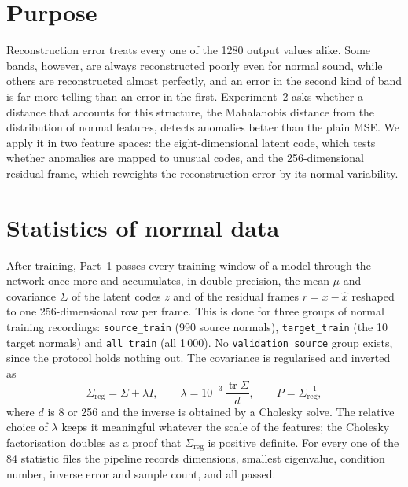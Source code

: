 \section{Purpose}
Reconstruction error treats every one of the 1280 output values alike. Some bands, however, are always reconstructed poorly even for normal sound, while others are reconstructed almost perfectly, and an error in the second kind of band is far more telling than an error in the first. Experiment~2 asks whether a distance that accounts for this structure, the Mahalanobis distance from the distribution of normal features, detects anomalies better than the plain MSE. We apply it in two feature spaces: the eight-dimensional latent code, which tests whether anomalies are mapped to unusual codes, and the 256-dimensional residual frame, which reweights the reconstruction error by its normal variability.

\section{Statistics of normal data}
After training, Part~1 passes every training window of a model through the network once more and accumulates, in double precision, the mean $\mu$ and covariance $\Sigma$ of the latent codes $z$ and of the residual frames $r = x - \hat{x}$ reshaped to one 256-dimensional row per frame. This is done for three groups of normal training recordings: \texttt{source\_train} (990 source normals), \texttt{target\_train} (the 10 target normals) and \texttt{all\_train} (all 1\,000). No \texttt{validation\_source} group exists, since the protocol holds nothing out. The covariance is regularised and inverted as
\begin{equation}
\Sigma_\mathrm{reg} = \Sigma + \lambda I, \qquad \lambda = 10^{-3}\,\frac{\operatorname{tr}\Sigma}{d}, \qquad P = \Sigma_\mathrm{reg}^{-1},
\label{eq:reg}
\end{equation}
where $d$ is 8 or 256 and the inverse is obtained by a Cholesky solve. The relative choice of $\lambda$ keeps it meaningful whatever the scale of the features; the Cholesky factorisation doubles as a proof that $\Sigma_\mathrm{reg}$ is positive definite. For every one of the 84 statistic files the pipeline records dimensions, smallest eigenvalue, condition number, inverse error and sample count, and all passed.

